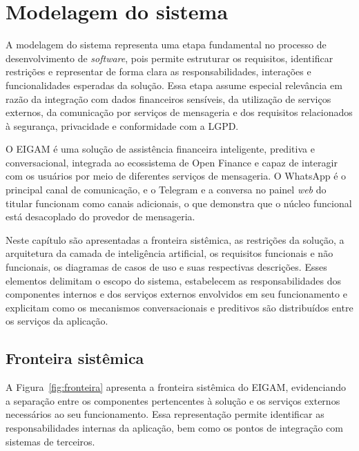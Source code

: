 \chapter{Modelagem do sistema}\label{chap:modelagem}

A modelagem do sistema representa uma etapa fundamental no processo de desenvolvimento de \textit{software}, pois permite estruturar os requisitos, identificar restrições e representar de forma clara as responsabilidades, interações e funcionalidades esperadas da solução. Essa etapa assume especial relevância em razão da integração com dados financeiros sensíveis, da utilização de serviços externos, da comunicação por serviços de mensageria e dos requisitos relacionados à segurança, privacidade e conformidade com a LGPD.

O EIGAM é uma solução de assistência financeira inteligente, preditiva e conversacional, integrada ao ecossistema de Open Finance e capaz de interagir com os usuários por meio de diferentes serviços de mensageria. O WhatsApp é o principal canal de comunicação, e o Telegram e a conversa no painel \textit{web} do titular funcionam como canais adicionais, o que demonstra que o núcleo funcional está desacoplado do provedor de mensageria.

Neste capítulo são apresentadas a fronteira sistêmica, as restrições da solução, a arquitetura da camada de inteligência artificial, os requisitos funcionais e não funcionais, os diagramas de casos de uso e suas respectivas descrições. Esses elementos delimitam o escopo do sistema, estabelecem as responsabilidades dos componentes internos e dos serviços externos envolvidos em seu funcionamento e explicitam como os mecanismos conversacionais e preditivos são distribuídos entre os serviços da aplicação.

\section{Fronteira sistêmica}

A Figura~\ref{fig:fronteira} apresenta a fronteira sistêmica do EIGAM, evidenciando a separação entre os componentes pertencentes à solução e os serviços externos necessários ao seu funcionamento. Essa representação permite identificar as responsabilidades internas da aplicação, bem como os pontos de integração com sistemas de terceiros.

